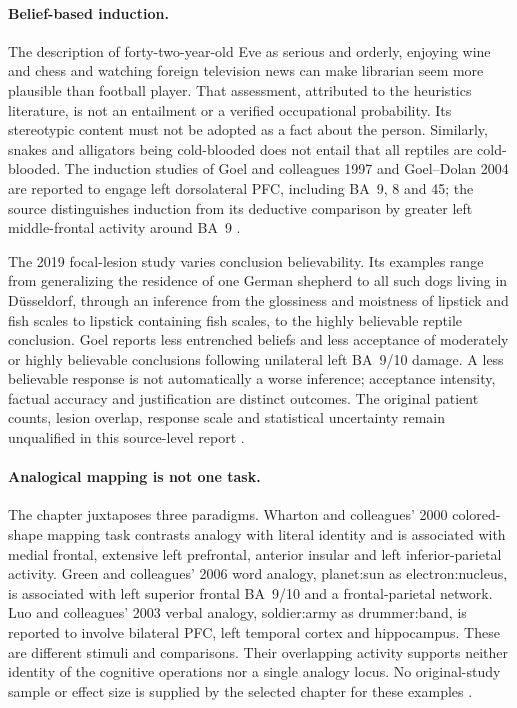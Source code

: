 \paragraph{Belief-based induction.}
The description of forty-two-year-old Eve as serious and orderly, enjoying wine and chess and
watching foreign television news can make librarian seem more plausible
than football player. That assessment, attributed to the heuristics
literature, is not an entailment or a verified occupational probability.
Its stereotypic content must not be adopted as a fact about the person.
Similarly, snakes and alligators being cold-blooded does not entail that
all reptiles are cold-blooded. The induction studies of Goel and colleagues
1997 and Goel--Dolan 2004 are reported to engage left dorsolateral PFC,
including BA~9, 8 and 45; the source distinguishes induction from its
deductive comparison by greater left middle-frontal activity around BA~9
\cite[p.~118, fig.~1.4.1a]{Goel2021RationalityBrain}.

The 2019 focal-lesion study varies conclusion believability. Its examples
range from generalizing the residence of one German shepherd to all such
dogs living in D\"usseldorf, through an inference from the glossiness and
moistness of lipstick and fish scales to lipstick containing fish scales,
to the highly believable reptile conclusion. Goel reports less entrenched
beliefs and less acceptance of moderately or highly believable conclusions
following unilateral left BA~9/10 damage. A less believable response is
not automatically a worse inference; acceptance intensity, factual
accuracy and justification are distinct outcomes. The original patient
counts, lesion overlap, response scale and statistical uncertainty remain
unqualified in this source-level report
\cite[p.~118]{Goel2021RationalityBrain}.

\paragraph{Analogical mapping is not one task.}
The chapter juxtaposes three paradigms. Wharton and colleagues' 2000
colored-shape mapping task contrasts analogy with literal identity and
is associated with medial frontal, extensive left prefrontal, anterior
insular and left inferior-parietal activity. Green and colleagues' 2006
word analogy, planet:sun as electron:nucleus, is associated with left
superior frontal BA~9/10 and a frontal-parietal network. Luo and colleagues'
2003 verbal analogy, soldier:army as drummer:band, is reported to involve
bilateral PFC, left temporal cortex and hippocampus. These are different
stimuli and comparisons. Their overlapping activity supports neither
identity of the cognitive operations nor a single analogy locus. No
original-study sample or effect size is supplied by the selected chapter
for these examples \cite[p.~118]{Goel2021RationalityBrain}.

